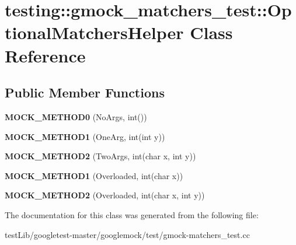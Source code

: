 \hypertarget{classtesting_1_1gmock__matchers__test_1_1OptionalMatchersHelper}{}\section{testing\+:\+:gmock\+\_\+matchers\+\_\+test\+:\+:Optional\+Matchers\+Helper Class Reference}
\label{classtesting_1_1gmock__matchers__test_1_1OptionalMatchersHelper}
\subsection*{Public Member Functions}
\begin{DoxyCompactItemize}
\item 
\mbox{\label{classtesting_1_1gmock__matchers__test_1_1OptionalMatchersHelper_a8e2a60b72259529d2b6c0f37ac47dde9}} 
{\bfseries M\+O\+C\+K\+\_\+\+M\+E\+T\+H\+O\+D0} (No\+Args, int())
\item 
\mbox{\label{classtesting_1_1gmock__matchers__test_1_1OptionalMatchersHelper_ab35fac331bbcf18e1a7e95305d4cc34d}} 
{\bfseries M\+O\+C\+K\+\_\+\+M\+E\+T\+H\+O\+D1} (One\+Arg, int(int y))
\item 
\mbox{\label{classtesting_1_1gmock__matchers__test_1_1OptionalMatchersHelper_a51f6da96a6607d70c8ea6d5f4aedb39f}} 
{\bfseries M\+O\+C\+K\+\_\+\+M\+E\+T\+H\+O\+D2} (Two\+Args, int(char x, int y))
\item 
\mbox{\label{classtesting_1_1gmock__matchers__test_1_1OptionalMatchersHelper_a782311cb85f341cf6b45f0b9f015e779}} 
{\bfseries M\+O\+C\+K\+\_\+\+M\+E\+T\+H\+O\+D1} (Overloaded, int(char x))
\item 
\mbox{\label{classtesting_1_1gmock__matchers__test_1_1OptionalMatchersHelper_a2051b793f9f68027e8861ec999739b9a}} 
{\bfseries M\+O\+C\+K\+\_\+\+M\+E\+T\+H\+O\+D2} (Overloaded, int(char x, int y))
\end{DoxyCompactItemize}


The documentation for this class was generated from the following file\+:\begin{DoxyCompactItemize}
\item 
test\+Lib/googletest-\/master/googlemock/test/gmock-\/matchers\+\_\+test.\+cc\end{DoxyCompactItemize}
